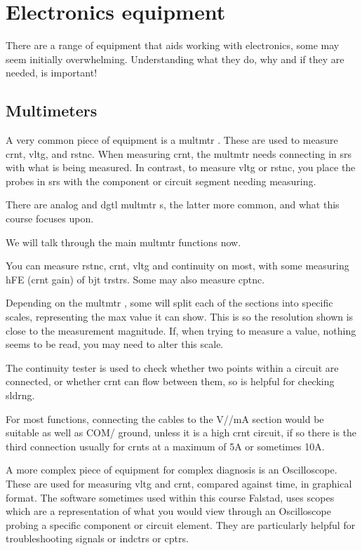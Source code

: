 \documentclass[a4paper,11pt]{report}
\begin{document}
\section{Electronics equipment}

There are a range of equipment that aids working with electronics, some may seem initially overwhelming. Understanding what they do, why and if they are needed, is important!

\vspace*{1\baselineskip}

\subsection{Multimeters}

A very common piece of equipment is a \gls{multmtr} . These are used to measure \gls{crnt}, \gls{vltg}, and \gls{rstnc}. When measuring \gls{crnt}, the \gls{multmtr}  needs connecting in \gls{srs} with what is being measured. In contrast, to measure \gls{vltg} or \gls{rstnc}, you place the probes in \gls{srs} with the component or circuit segment needing measuring.

There are analog and \gls{dgtl} \gls{multmtr} s, the latter more common, and what this course focuses upon.

We will talk through the main \gls{multmtr}  functions now.

You can measure \gls{rstnc}, \gls{crnt}, \gls{vltg} and continuity on most, with some measuring hFE (\gls{crnt} gain) of \gls{bjt} \gls{trstr}s. Some may also measure \gls{cptnc}.

Depending on the \gls{multmtr} , some will split each of the sections into specific scales, representing the max value it can show. This is so the resolution shown is close to the measurement magnitude. If, when trying to measure a value, nothing seems to be read, you may need to alter this scale.

The continuity tester is used to check whether two points within a circuit are connected, or whether \gls{crnt} can flow between them, so is helpful for checking \gls{sldrng}.

For most functions, connecting the cables to the V/\ohm/mA section would be suitable as well as COM/ ground, unless it is a high \gls{crnt} circuit, if so there is the third connection usually for \gls{crnt}s at a maximum of 5A or sometimes 10A.

A more complex piece of equipment for complex diagnosis is an Oscilloscope. These are used for measuring \gls{vltg} and \gls{crnt}, compared against time, in graphical format. The software sometimes used within this course Falstad, uses scopes which are a representation of what you would view through an Oscilloscope probing a specific component or circuit element. They are particularly helpful for troubleshooting signals or \gls{indctr}s or \gls{cptr}s.
\end{document}

